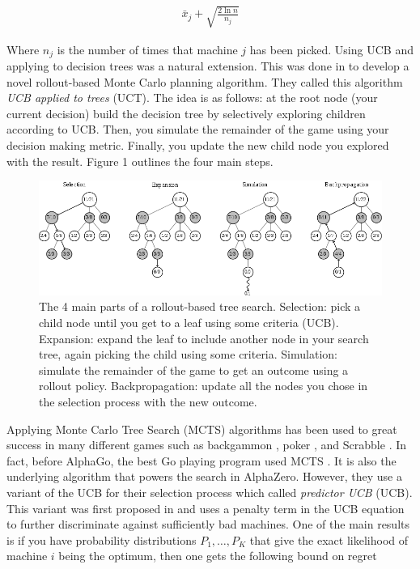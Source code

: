 \documentclass{article}
\begin{document}
  \begin{gather*}
    \bar{x}_j + \sqrt{\frac{2 \ln n}{n_j}}
  \end{gather*}

  Where $n_j$ is the number of times that machine $j$ has been picked. Using UCB and applying to decision trees was a natural extension. This was done in \cite{kocsis_bandit_2006} to develop a novel rollout-based Monte Carlo planning algorithm. They called this algorithm \textit{UCB applied to trees} (UCT). The idea is as follows: at the root node (your current decision) build the decision tree by selectively exploring children according to UCB. Then, you simulate the remainder of the game using your decision making metric. Finally, you update the new child node you explored with the result. Figure 1 outlines the four main steps.

  \begin{figure}[H]
    \centering
      \includegraphics[width=\textwidth]{mcts}
    \caption[Diagram of general MCTS algorithm]{The 4 main parts of a rollout-based tree search. Selection: pick a child node until you get to a leaf using some criteria (UCB). Expansion: expand the leaf to include another node in your search tree, again picking the child using some criteria. Simulation: simulate the remainder of the game to get an outcome using a rollout policy. Backpropagation: update all the nodes you chose in the selection process with the new outcome.}
  \end{figure}

  Applying Monte Carlo Tree Search (MCTS) algorithms has been used to great success in many different games such as backgammon \cite{tesauro_-line_1997}, poker \cite{billings_challenge_2002}, and Scrabble \cite{sheppard_world-championship-caliber_2002}. In fact, before AlphaGo, the best Go playing program used MCTS \cite{browne_survey_2012}. It is also the underlying algorithm that powers the search in AlphaZero. However, they use a variant of the UCB for their selection process which called \textit{predictor UCB} (UCB). This variant was first proposed in \cite{rosin_multi-armed_2011} and uses a penalty term in the UCB equation to further discriminate against sufficiently bad machines. One of the main results is if you have probability distributions $P_1, \dots, P_K$ that give the exact likelihood of machine $i$ being the optimum, then one gets the following bound on regret
\end{document}
